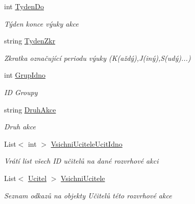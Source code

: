 \begin{DoxyCompactItemize}
int \hyperlink{class_analyza_rozvrhu_1_1_s_t_a_g___classes_1_1_rozvrhova_akce_a1e730998c8da55d5d5cae35d414669ce}{Tyden\+Do}
\begin{DoxyCompactList}\small\item\em Týden konce výuky akce \end{DoxyCompactList}\item 
string \hyperlink{class_analyza_rozvrhu_1_1_s_t_a_g___classes_1_1_rozvrhova_akce_a85aa2f038a80b2071c3647dc743da03c}{Tyden\+Zkr}
\begin{DoxyCompactList}\small\item\em Zkratka označující periodu výuky (K(aždý),J(iný),S(udý)...) \end{DoxyCompactList}\item 
int \hyperlink{class_analyza_rozvrhu_1_1_s_t_a_g___classes_1_1_rozvrhova_akce_ad02d8e2ae7b8fc243b7f42ee6a42a7ea}{Grup\+Idno}
\begin{DoxyCompactList}\small\item\em ID Groupy \end{DoxyCompactList}\item 
string \hyperlink{class_analyza_rozvrhu_1_1_s_t_a_g___classes_1_1_rozvrhova_akce_aed07e69ac5a0bd9dd3dfab06f6c6ef96}{Druh\+Akce}
\begin{DoxyCompactList}\small\item\em Druh akce \end{DoxyCompactList}\item 
List$<$ int $>$ \hyperlink{class_analyza_rozvrhu_1_1_s_t_a_g___classes_1_1_rozvrhova_akce_a0389a640bde212d0f5146f69ff8acd72}{Vsichni\+Ucitele\+Ucit\+Idno}
\begin{DoxyCompactList}\small\item\em Vrátí list všech ID učitelů na dané rozvrhové akci \end{DoxyCompactList}\item 
List$<$ \hyperlink{class_analyza_rozvrhu_1_1_s_t_a_g___classes_1_1_ucitel}{Ucitel} $>$ \hyperlink{class_analyza_rozvrhu_1_1_s_t_a_g___classes_1_1_rozvrhova_akce_a30c1faa5c2bb10052424d892fc54d1c8}{Vsichni\+Ucitele}
\begin{DoxyCompactList}\small\item\em Seznam odkazů na objekty Učitelů této rozvrhové akce \end{DoxyCompactList}\end{DoxyCompactItemize}


